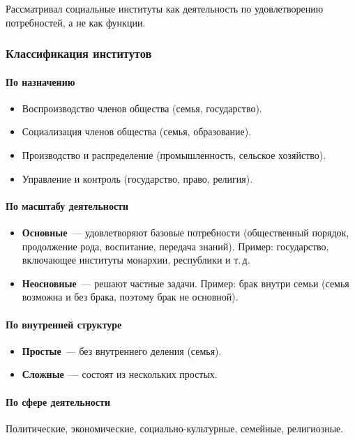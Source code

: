 \documentclass[12pt]{article}
\begin{document}
	\begin{person}
		Рассматривал социальные институты как деятельность по удовлетворению потребностей, а не как функции.
	\end{person}

	\subsubsection{Классификация институтов}

	\paragraph{По назначению}
	\begin{itemize}
		\item Воспроизводство членов общества (семья, государство).
		\item Социализация членов общества (семья, образование).
		\item Производство и распределение (промышленность, сельское хозяйство).
		\item Управление и контроль (государство, право, религия).
	\end{itemize}

	\paragraph{По масштабу деятельности}
	\begin{itemize}
		\item \textbf{Основные}~--- удовлетворяют базовые потребности (общественный порядок, продолжение рода, воспитание, передача знаний). Пример: государство, включающее институты монархии, республики и т.\,д.
		\item \textbf{Неосновные}~--- решают частные задачи. Пример: брак внутри семьи (семья возможна и без брака, поэтому брак не основной).
	\end{itemize}

	\paragraph{По внутренней структуре}
	\begin{itemize}
		\item \textbf{Простые}~--- без внутреннего деления (семья).
		\item \textbf{Сложные}~--- состоят из нескольких простых.
	\end{itemize}

	\paragraph{По сфере деятельности}
	Политические, экономические, социально-культурные, семейные, религиозные.
\end{document}
